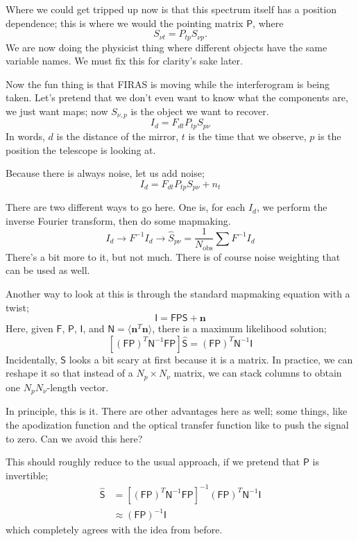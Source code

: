 \documentclass{article}
\begin{document}
Where we could get tripped up now is that this spectrum itself has a position dependence; this is where we would the pointing matrix $\mathsf P$, where
\[
	S_{\nu t}=P_{tp}S_{\nu p}.
\]
We are now doing the physicist thing where different objects have the same variable names. We must fix this for clarity's sake later.

Now the fun thing is that FIRAS is moving while the interferogram is being taken. Let's pretend that we don't even want to know what the components are, we just want maps; now $S_{\nu,p}$ is the object we want to recover.
\[
	I_d = F_{dt}P_{tp}S_{p\nu}
\]
In words, $d$ is the distance of the mirror, $t$ is the time that we observe, $p$ is the position the telescope is looking at.

Because there is always noise, let us add noise;
\[
	I_d =F_{dt}P_{tp}S_{p\nu}+n_t
\]

There are two different ways to go here. One is, for each $I_d$, we perform the inverse Fourier transform, then do some mapmaking.
\[
	I_d\to F^{-1}I_d\to \hat S_{p\nu}=\frac1{N_\mathrm{obs}}\sum F^{-1}I_d
\]
There's a bit more to it, but not much. There is of course noise weighting that can be used as well.

Another way to look at this is through the standard mapmaking equation with a twist;
\[
	\mathsf I=\mathsf{FPS}+\boldsymbol n
\]
Here, given $\mathsf F$, $\mathsf P$, $\mathsf I$, and $\mathsf N=\langle\boldsymbol n^T\boldsymbol n\rangle$, there is a maximum likelihood solution;
\[
	[(\mathsf{FP})^T\mathsf N^{-1}\mathsf{FP}]\hat{\mathsf S}
	=(\mathsf{FP})^T\mathsf N^{-1}\mathsf I
\]
Incidentally, $\mathsf S$ looks a bit scary at first because it is a matrix. In practice, we can reshape it so that instead of a $N_p\times N_\nu$ matrix, we can stack columns to obtain one $N_pN_\nu$-length vector.

In principle, this is it. There are other advantages here as well; some things, like the apodization function and the optical transfer function like to push the signal to zero. Can we avoid this here?

This should roughly reduce to the usual approach, if we pretend that $\mathsf P$ is invertible;
\begin{align*}
	\hat{\mathsf S}&=
	[(\mathsf{FP})^T\mathsf N^{-1}\mathsf{FP}]^{-1}(\mathsf{FP})^T\mathsf N^{-1}\mathsf I
	\\
	&\approx (\mathsf{FP})^{-1}\mathsf I
\end{align*}
which completely agrees with the idea from before.
\end{document}
